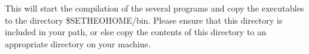 This will start the compilation of the several programs and copy the 
executables to the directory \$SETHEOHOME/bin.
Please ensure that this directory is included in your path, or else copy the
contents of this directory to an appropriate directory on your machine.

%
%
%
%
%
%
%
%
%
% 
%
%
%
%  
%      
%
%
